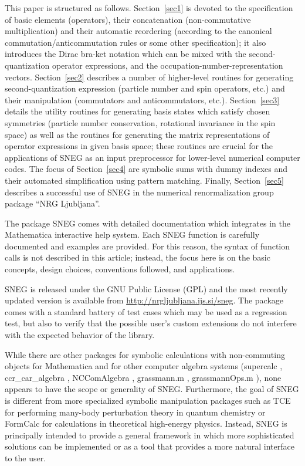 \documentclass[3p,number,preprint]{elsarticle}
\begin{document}
This paper is structured as follows. Section~\ref{sec1} is devoted to
the specification of basic elements (operators), their concatenation
(non-commutative multiplication) and their automatic reordering
(according to the canonical commutation/anticommutation rules or some
other specification); it also introduces the Dirac bra-ket notation
which can be mixed with the second-quantization operator expressions,
and the occupation-number-representation vectors. Section~\ref{sec2}
describes a number of higher-level routines for generating
second-quantization expression (particle number and spin operators,
etc.) and their manipulation (commutators and anticommutators, etc.).
Section~\ref{sec3} details the utility routines for generating basis
states which satisfy chosen symmetries (particle number conservation,
rotational invariance in the spin space) as well as the routines for
generating the matrix representations of operator expressions in given
basis space; these routines are crucial for the applications of SNEG
as an input preprocessor for lower-level numerical computer codes. The
focus of Section~\ref{sec4} are symbolic sums with dummy indexes and
their automated simplification using pattern matching. Finally,
Section~\ref{sec5} describes a successful use of SNEG in the numerical
renormalization group package ``NRG Ljubljana''.

The package SNEG comes with detailed documentation which integrates in
the Mathematica interactive help system. Each SNEG function is
carefully documented and examples are provided. For this reason, the
syntax of function calls is not described in this article; instead,
the focus here is on the basic concepts, design choices, conventions
followed, and applications.

SNEG is released under the GNU Public License (GPL) and the most
recently updated version is available from
\url{http://nrgljubljana.ijs.si/sneg}. The package comes with a
standard battery of test cases which may be used as a regression test,
but also to verify that the possible user's custom extensions do not
interfere with the expected behavior of the library. 



While there are other packages for symbolic calculations with
non-commuting objects for Mathematica and for other computer algebra
systems (supercalc \cite{supercalc}, ccr\_car\_algebra \cite{ccrcar},
NCComAlgebra \cite{nccomalgebra}, grassmann.m \cite{grassmann},
grassmannOps.m \cite{grassmannOps}), none appears to have the scope or
generality of SNEG. Furthermore, the goal of SNEG is different from
more specialized symbolic manipulation packages such as TCE \cite{tce,
hirata2006} for performing many-body perturbation theory in quantum
chemistry or FormCalc \cite{formcalc} for calculations in theoretical
high-energy physics. Instead, SNEG is principally intended to provide
a general framework in which more sophisticated solutions can be
implemented or as a tool that provides a more natural interface to the
user.
\end{document}
